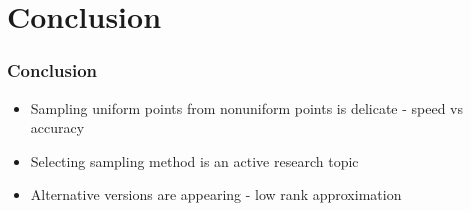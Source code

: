 \documentclass{beamer}
\begin{document}
\section{Conclusion}
\begin{frame}
  \frametitle{Conclusion}

  \begin{itemize}
      \item Sampling uniform points from nonuniform points is delicate - speed vs accuracy
      \item Selecting sampling method is an active research topic
      \item Alternative versions are appearing - low rank approximation
  \end{itemize}


\end{frame}
\end{document}
